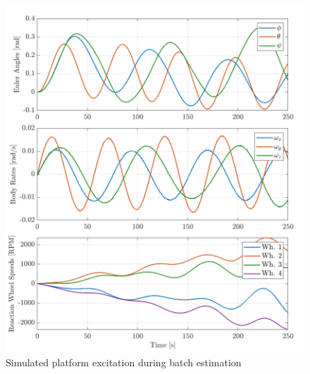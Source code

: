 \begin{figure}[!ht]
    \centering
    \includegraphics[width=\linewidth]{plots/LSR_sim_excitation}
    \caption{Simulated platform excitation during batch estimation}
\end{figure}


